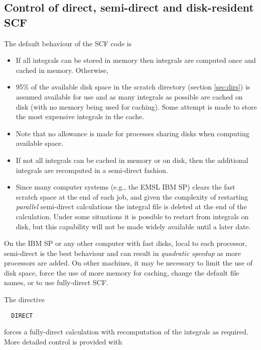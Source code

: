 \subsection{Control of direct, semi-direct and disk-resident SCF}
\label{sec:semidirect}

The default behaviour of the SCF code is
\begin{itemize}
\item If all integrals can be stored in memory then integrals are
  computed once and cached in memory. Otherwise,
\item 95\% of the available disk space in the scratch directory
  (section \ref{sec:dirs}) is assumed available for use
  and as many integrals as possible are cached on disk (with no
  memory being used for caching).  Some attempt is made to 
  store the most expensive integrals in the cache.
\item Note that no allowance is made for processes sharing
  disks when computing available space.
\item If not all integrals can be cached in memory or on disk,
  then the additional integrals are recomputed in a semi-direct
  fashion.
\item Since many computer systems (e.g., the EMSL IBM SP) clears the
  fast scratch space at the end of each job, and given the complexity
  of restarting {\em parallel} semi-direct calculations the integral
  file is deleted at the end of the calculation.  Under some
  situations it is possible to restart from integrals on disk, but
  this capability will not be made widely available until a later date.
\end{itemize}

On the IBM SP or any other computer with fast disks, local to each
processor, semi-direct is the best behaviour and can result in {\em
  quadratic speedup} as more processors are added.  On other machines,
it may be necessary to limit the use of disk space, force the use of
more memory for caching, change the default file names, or to use
fully-direct SCF.

The directive
\begin{verbatim}
  DIRECT
\end{verbatim}
forces a fully-direct calculation with recomputation of the integrals
as required.  More detailed control is provided with

